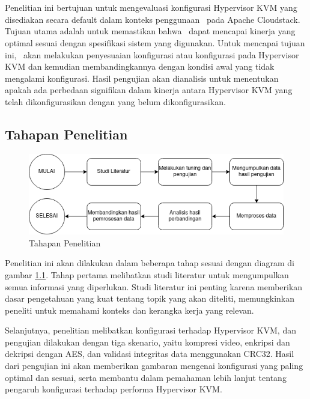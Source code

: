 \chapter{\babTiga}
Penelitian ini bertujuan untuk mengevaluasi konfigurasi Hypervisor KVM yang disediakan secara default dalam konteks penggunaan \vm\ pada Apache Cloudstack. Tujuan utama adalah untuk memastikan bahwa \vm\ dapat mencapai kinerja yang optimal sesuai dengan spesifikasi sistem yang digunakan. Untuk mencapai tujuan ini, \saya\ akan melakukan penyesuaian konfigurasi atau konfigurasi pada Hypervisor KVM dan kemudian membandingkannya dengan kondisi awal yang tidak mengalami konfigurasi. Hasil pengujian akan dianalisis untuk menentukan apakah ada perbedaan signifikan dalam kinerja antara Hypervisor KVM yang telah dikonfigurasikan dengan yang belum dikonfigurasikan.

\section{Tahapan Penelitian}
\begin{figure}
    \centering
    \includegraphics[width=1\textwidth]
    {assets/pics/tahapan-penelitian.png}
    \caption{Tahapan Penelitian}
    \label{fig:TahapanPenelitian}
\end{figure}

Penelitian ini akan dilakukan dalam beberapa tahap sesuai dengan diagram di gambar \ref{fig:TahapanPenelitian}. Tahap pertama melibatkan studi literatur untuk mengumpulkan semua informasi yang diperlukan. Studi literatur ini penting karena memberikan dasar pengetahuan yang kuat tentang topik yang akan diteliti, memungkinkan peneliti untuk memahami konteks dan kerangka kerja yang relevan.

Selanjutnya, penelitian melibatkan konfigurasi terhadap Hypervisor KVM, dan pengujian dilakukan dengan tiga skenario, yaitu kompresi video, enkripsi dan dekripsi dengan AES, dan validasi integritas data menggunakan CRC32. Hasil dari pengujian ini akan memberikan gambaran mengenai konfigurasi yang paling optimal dan sesuai, serta membantu dalam pemahaman lebih lanjut tentang pengaruh konfigurasi terhadap performa Hypervisor KVM.

